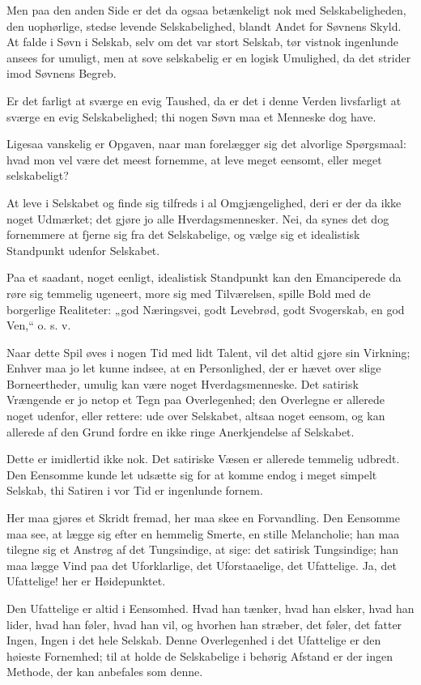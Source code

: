 \documentclass[12pt,a4paper]{book}
\newcommand{\apage}[1]{\marginnote{\footnotesize\textit{[#1]}}}
\begin{document}
Men paa den anden Side er det da ogsaa betænkeligt nok med Selskabeligheden, den uophørlige, stedse levende Selskabelighed, blandt Andet for Søvnens Skyld. At falde i Søvn i Selskab, selv om det var stort Selskab, tør vistnok ingenlunde ansees for umuligt, men at sove selskabelig er en logisk Umulighed, da det strider imod Søvnens Begreb.

Er det farligt at sværge en evig Taushed, da er det i denne Verden livsfarligt at sværge en evig Selskabelighed; thi nogen Søvn maa et Menneske dog have.

Ligesaa vanskelig er Opgaven, naar man forelægger sig det alvorlige Spørgsmaal: hvad mon vel være det meest fornemme, at leve meget eensomt, eller meget selskabeligt?

At leve i Selskabet og finde sig tilfreds i al Omgjængelighed, deri er der da ikke noget Udmærket; det gjøre jo alle Hverdagsmennesker. Nei, da synes det dog fornemmere at fjerne sig fra det Selskabelige, og vælge sig et idealistisk Standpunkt udenfor Selskabet.

Paa et saadant, noget eenligt, idealistisk Standpunkt kan den Emanciperede da røre sig temmelig ugeneert, more sig med Tilværelsen, spille Bold med de borgerlige Realiteter: „god Næringsvei, godt Levebrød, godt Svogerskab, en god Ven,“ o. s. v.

Naar dette Spil øves i nogen Tid med lidt Talent, vil det altid gjøre sin Virkning; Enhver maa jo let kunne indsee, at en Personlighed, der er hævet over slige Borneertheder, umulig kan være noget Hverdagsmenneske. Det satirisk Vrængende er jo netop et Tegn paa Overlegenhed; den Overlegne er allerede noget udenfor, eller rettere: ude over Selskabet, \apage{45}
altsaa noget eensom, og kan allerede af den Grund fordre en ikke ringe Anerkjendelse af Selskabet.

Dette er imidlertid ikke nok. Det satiriske Væsen er allerede temmelig udbredt. Den Eensomme kunde let udsætte sig for at komme endog i meget simpelt Selskab, thi Satiren i vor Tid er ingenlunde fornem.

Her maa gjøres et Skridt fremad, her maa skee en Forvandling. Den Eensomme maa see, at lægge sig efter en hemmelig Smerte, en stille Melancholie; han maa tilegne sig et Anstrøg af det Tungsindige, at sige: det satirisk Tungsindige; han maa lægge Vind paa det Uforklarlige, det Uforstaaelige, det Ufattelige. Ja, det Ufattelige! her er Høidepunktet.

Den Ufattelige er altid i Eensomhed. Hvad han tænker, hvad han elsker, hvad han lider, hvad han føler, hvad han vil, og hvorhen han stræber, det føler, det fatter Ingen, Ingen i det hele Selskab. Denne Overlegenhed i det Ufattelige er den høieste Fornemhed; til at holde de Selskabelige i behørig Afstand er der ingen Methode, der kan anbefales som denne.
\end{document}
